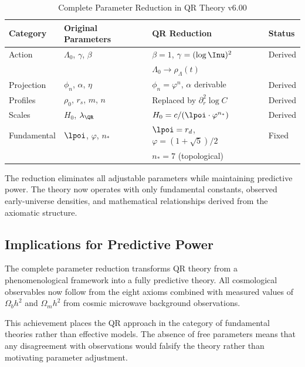 \begin{table}[H]
  \caption{Complete Parameter Reduction in QR Theory v6.00}
  \label{tab:parameter-reduction}
  \centering
  \begin{tabular}{@{}llll@{}}
    \toprule
    \textbf{Category} & \textbf{Original Parameters} & \textbf{QR Reduction} & \textbf{Status} \\
    \midrule
    Action      & $\Lambda_0$, $\gamma$, $\beta$ & $\beta = 1$, $\gamma = (\log \Inu)^2$ & Derived \\
                &                                & $\Lambda_0 \rightarrow \rho_\Lambda(t)$ & \\
    Projection  & $\phi_n$, $\alpha$, $\eta$     & $\phi_n = \varphi^n$, $\alpha$ derivable & Derived \\
    Profiles    & $\rho_0$, $r_s$, $m$, $n$      & Replaced by $\partial_r^2 \log C$ & Derived \\
    Scales      & $H_0$, $\lambda_{\QR}$         & $H_0 = c/(\lpoi \cdot \varphi^{n_*})$ & Derived \\
    Fundamental & $\lpoi$, $\varphi$, $n_*$      & $\lpoi = r_d$, $\varphi = (1+\sqrt{5})/2$ & Fixed \\
                &                                & $n_* = 7$ (topological) & \\
    \bottomrule
  \end{tabular}
\end{table}

The reduction eliminates all adjustable parameters while maintaining predictive power. The theory now operates with only fundamental constants, observed early-universe densities, and mathematical relationships derived from the axiomatic structure.

\subsection{Implications for Predictive Power}
\label{subsec:predictive-implications}

The complete parameter reduction transforms QR theory from a phenomenological framework into a fully predictive theory. All cosmological observables now follow from the eight axioms combined with measured values of $\Omega_b h^2$ and $\Omega_m h^2$ from cosmic microwave background observations.

This achievement places the QR approach in the category of fundamental theories rather than effective models. The absence of free parameters means that any disagreement with observations would falsify the theory rather than motivating parameter adjustment.

